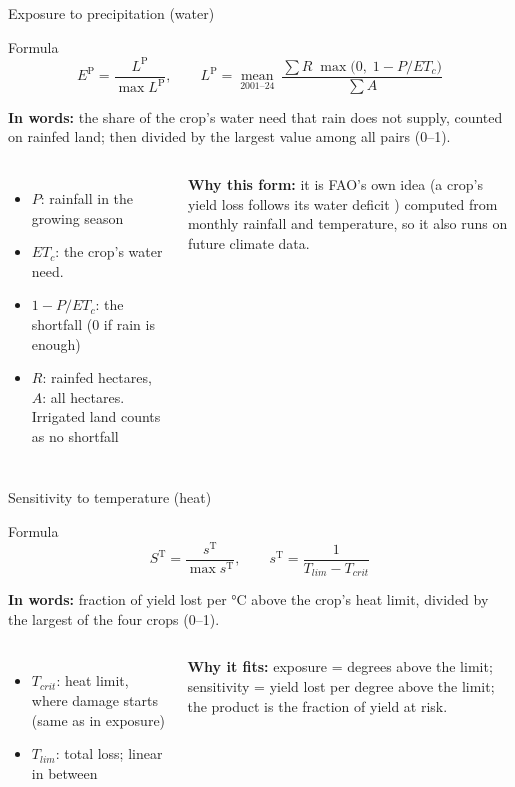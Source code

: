 \documentclass[aspectratio=169,11pt]{beamer}
\let\parencite\citep
\newcommand{\TT}{\mathrm{T}}   %
\newcommand{\PP}{\mathrm{P}}   %
\begin{document}
\begin{frame}{Exposure to precipitation (water)}
\begin{block}{Formula}
\[E^{\PP}=\frac{L^{\PP}}{\max L^{\PP}},\qquad L^{\PP}=\operatorname*{mean}_{2001\text{--}24}\ \frac{\sum R\;\max\!\big(0,\;1-P/ET_c\big)}{\sum A}\]
\end{block}
\textbf{In words:} the share of the crop's water need that rain does not supply, counted on rainfed land; then divided by the largest value among all pairs (0--1).

\begin{columns}[T]
\footnotesize
\begin{itemize}\setlength{\itemsep}{2pt}
\item $P$: rainfall in the growing season
\item $ET_c$: the crop's water need. \parencite{fao56}
\item $1-P/ET_c$: the shortfall (0 if rain is enough)
\item $R$: rainfed hectares, $A$: all hectares. Irrigated land counts as no shortfall
\end{itemize}
\footnotesize
\textbf{Why this form:} it is FAO's own idea (a crop's yield loss follows its water deficit \parencite{fao66}) computed from monthly rainfall and temperature, so it also runs on future climate data.\\[0.4em]
\end{columns}
\end{frame}

\begin{frame}{Sensitivity to temperature (heat)}
\begin{block}{Formula}
\[S^{\TT}=\frac{s^{\TT}}{\max s^{\TT}},\qquad s^{\TT}=\frac{1}{T_{lim}-T_{crit}}\]
\end{block}
\textbf{In words:} fraction of yield lost per \si{\celsius} above the crop's heat limit, divided by the largest of the four crops (0--1).

\begin{columns}[T]
\footnotesize
\begin{itemize}\setlength{\itemsep}{1pt}
\item $T_{crit}$: heat limit, where damage starts (same as in exposure)
\item $T_{lim}$: total loss; linear in between \parencite{deryng2014}
\end{itemize}
\textbf{Why it fits:} exposure = degrees above the limit; sensitivity = yield lost per degree above the limit; the product is the fraction of yield at risk.
\footnotesize\centering
{}\\[0.4em]
\end{columns}
\end{frame}
\end{document}
